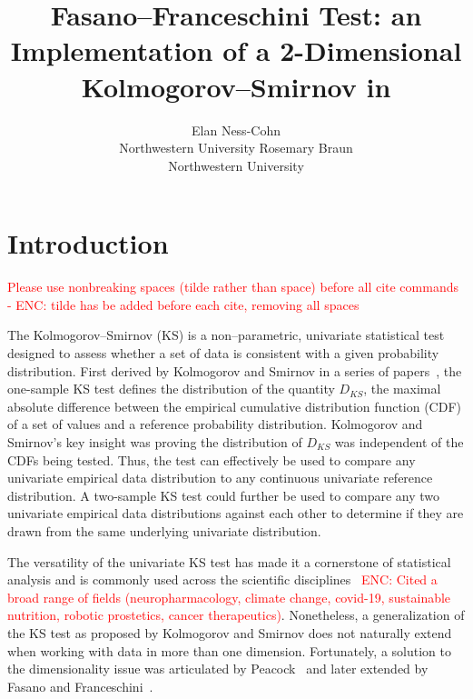 \documentclass[codesnippet]{jss}
\author{Elan Ness-Cohn\\Northwestern University
   \And Rosemary Braun\\Northwestern University}
\title{Fasano--Franceschini Test: an Implementation of a 2-Dimensional Kolmogorov--Smirnov in \proglang{R}}
\newcommand{\RBnote}[1]{\textcolor{red}{#1}}
\begin{document}


\section[Introduction]{Introduction} \label{sec:intro}


\RBnote{Please use nonbreaking spaces (tilde rather than space) before all cite commands - ENC: tilde has be added before each cite, removing all spaces}

The Kolmogorov--Smirnov (KS) is a non--parametric, univariate statistical test designed to assess whether a set of data is consistent with a given probability distribution. First derived by Kolmogorov and Smirnov in a series of papers~\citep{Kolmogorov1933,Kolmogorov1933a,Smirnov1936,Smirnov1937,Smirnov1939,Smirnov1944,Smirnov1948}, the one-sample KS test defines the distribution of the quantity $D_{KS}$, the maximal absolute difference between the empirical cumulative distribution function (CDF) of a set of values and a reference probability distribution. Kolmogorov and Smirnov's key insight was proving the distribution of $D_{KS}$ was independent of the CDFs being tested. Thus, the test can effectively be used to compare any univariate empirical data distribution to any continuous univariate reference distribution. A two-sample KS test could further be used to compare any two univariate empirical data distributions against each other to determine if they are drawn from the same underlying univariate distribution.

The versatility of the univariate KS test has made it a cornerstone of statistical analysis and is commonly used across the scientific disciplines~\citep{Atasoy2017,Chiang2018,Hahne2018,Hargreaves2020,Wong2020,Kaczanowska2021} \RBnote{ENC: Cited a broad range of fields (neuropharmacology, climate change, covid-19, sustainable nutrition, robotic prostetics, cancer therapeutics)}. Nonetheless, a generalization of the KS test as proposed by Kolmogorov and Smirnov does not naturally extend when working with data in more than one dimension. Fortunately, a solution to the dimensionality issue was articulated by Peacock~\citep{Peacock1983} and later extended by Fasano and Franceschini~\citep{Fasano1987}.
\end{document}
